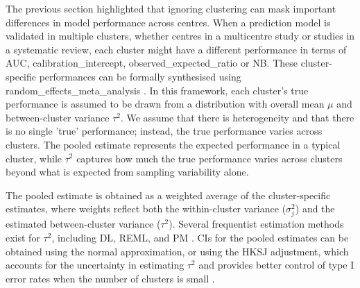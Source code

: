 The previous section highlighted that ignoring clustering can mask important differences in model performance across centres. When a prediction model is validated in multiple clusters, whether centres in a multicentre study or studies in a systematic review, each cluster might have a different performance in terms of \gls{AUC}, \gls{calibration_intercept}, \gls{observed_expected_ratio} or \gls{NB}. These cluster-specific performances can be formally synthesised using \gls{random_effects_meta_analysis} \cite{debrayGuideSystematicReview2017,debrayFrameworkMetaanalysisPrediction2019}. In this framework, each cluster's true performance is assumed to be drawn from a distribution with overall mean $\mu$ and between-cluster variance $\tau^2$. We assume that there is \gls{heterogeneity} and that there is no single 'true' performance; instead, the true performance varies across clusters. The pooled estimate represents the expected performance in a typical cluster, while $\tau^2$ captures how much the true performance varies across clusters beyond what is expected from sampling variability alone.

The pooled estimate is obtained as a weighted average of the cluster-specific estimates, where weights reflect both the within-cluster variance ($\sigma_j^2$) and the estimated between-cluster variance ($\tau^2$). Several frequentist estimation methods exist for $\tau^2$, including \gls{DL}, \gls{REML}, and \gls{PM} \cite{veronikiMethodsEstimateBetweenstudy2016}. \Glspl{CI} for the pooled estimates can be obtained using the normal approximation, or using the \gls{HKSJ} adjustment, which accounts for the uncertainty in estimating $\tau^2$ and provides better control of type I error rates when the number of clusters is small \cite{inthoutHartungKnappSidikJonkmanMethodRandom2014}.

